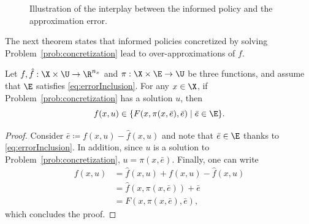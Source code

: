 \documentclass[letterpaper, 10 pt, conference]{ieeeconf}  %
\begin{document}
\begin{figure}
\centering
{}

\caption{Illustration of the interplay between the informed policy and the approximation error.}
\label{fig:preview_diagram}
\end{figure}



The next theorem states that informed policies concretized by solving Problem~\ref{prob:concretization} lead to over-approximations of $f$.
\begin{theorem} \label{thm:overapproximation}
Let $f,\hat{f}:\X\times\U\rightarrow\R^{n_x}$ and $\pi:\X\times\E\rightarrow\U$ be three functions, and assume that $\E$ satisfies \eqref{eq:errorInclusion}. For any $x\in\X$, if Problem~\ref{prob:concretization} has a solution $u$, then
$$
f(x,u)\in \{ F(x,\pi(x,\bar{e}),\bar{e}) \mid \bar{e}\in\E \}.
$$
\end{theorem}
\begin{proof}
Consider $\bar{e} \coloneq f(x,u)-\hat{f}(x,u)$ and note that $\bar{e}\in\E$ thanks to \eqref{eq:errorInclusion}. In addition, since $u$ is a solution to Problem~\ref{prob:concretization}, $u=\pi(x,\bar{e})$. Finally, one can write
\begin{align*}
f(x,u) &= \hat{f}(x,u)+f(x,u)-\hat{f}(x,u) \\
&=\hat{f}(x,\pi(x,\bar{e}))+\bar{e} \\
&= F(x,\pi(x,\bar{e}),\bar{e}),
\end{align*}
which concludes the proof.
\end{proof}
\end{document}
